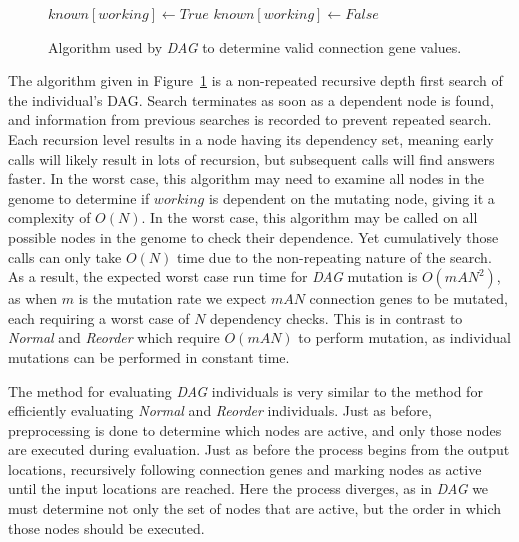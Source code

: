 \documentclass[journal]{IEEEtran}
\begin{document}
\begin{figure}
  \begin{algorithmic}
      \State{}
    \EndIf
        \State $known[working] \leftarrow True$
        \State{}
      \EndIf
    \EndFor
    \State $known[working] \leftarrow False$
    \State{}
  \EndProcedure
  \end{algorithmic}
  \caption{Algorithm used by \emph{DAG} to determine valid connection gene values.}
  \label{fig:dag}
\end{figure}

The algorithm given in Figure~\ref{fig:dag} is a non-repeated recursive depth
first search of the individual's DAG.  Search terminates as soon as a dependent
node is found, and information from previous searches is recorded to prevent
repeated search.  Each recursion level results in a node having its dependency
set, meaning early calls will likely result in lots of recursion, but subsequent
calls will find answers faster.  In the worst case, this algorithm may need
to examine all nodes in the genome to determine if $working$ is dependent on the
mutating node, giving it a complexity of $O(N)$.  In the worst case, this algorithm
may be called on all possible nodes in the genome to check their dependence.
Yet cumulatively those calls can only take $O(N)$ time due to the non-repeating
nature of the search.  As a result, the expected worst case run time for \emph{DAG}
mutation is $O(mAN^2)$, as when $m$ is the mutation rate we expect $mAN$
connection genes to be mutated, each requiring a worst case of $N$ dependency checks.
This is in contrast to \emph{Normal} and \emph{Reorder} which require $O(mAN)$ to perform
mutation, as individual mutations can be performed in constant time.

The method for evaluating \emph{DAG} individuals is very similar to the method for
efficiently evaluating \emph{Normal} and \emph{Reorder} individuals.  Just as before,
preprocessing is done to determine which nodes are active, and only those nodes are
executed during evaluation.  Just as before the process begins from the output locations,
recursively following connection genes and marking nodes as active until the input locations
are reached.  Here the process diverges, as in \emph{DAG} we must determine not only the set of
nodes that are active, but the order in which those nodes should be executed.
\end{document}
